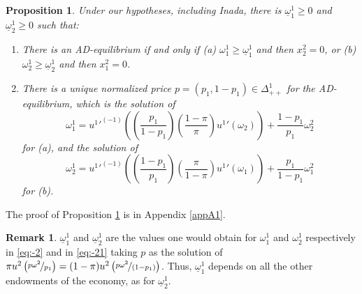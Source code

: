 \documentclass[pdftex]{article}
\numberwithin{equation}{section}
\theoremstyle{th}
\newtheorem{prop}{{Proposition}}%
\newtheorem{proof lemma}{{Proof Lemma}.}
\theoremstyle{definition}
\newtheorem{remark}{Remark}%
\newtheorem*{risk lovers}{Risk lovers}
\newtheorem*{risk averse}{Risk averse}
\begin{document}
\begin{prop}
\label{prop1}
Under our hypotheses, including Inada, there is $\underline{\omega}_1^1\geq0$ and $\underline{\omega}_2^1\geq0$ such that:
\begin{enumerate}
\item There is an AD-equilibrium if and only if (a) $\omega_1^1\geq\underline{\omega}_1^1$ and then $x_2^2=0$, or (b) $\omega_2^1\geq\underline{\omega}_2^1$ and then $x_1^2=0$. 

\item There is a unique normalized price $p=(p_1,1-p_1)\in\Delta_{++}^1$ for the AD-equilibrium, which is the solution of
\begin{equation}
\label{eq:-2}
\omega_1^1={{u^1}'}^{(-1)}\left(\left(\frac{p_1}{1-p_1}\right)\left(\frac{1-\pi}{\pi}\right){u^1}'\left(\omega_2\right)\right)+\frac{1-p_1}{p_1}\omega_2^2
\end{equation}
for (a), and the solution of
\begin{equation}
\label{eq:-21}
\omega_2^1={{u^1}'}^{(-1)}\left(\left(\frac{1-p_1}{p_1}\right)\left(\frac{\pi}{1-\pi}\right){u^1}'\left(\omega_1\right)\right)+\frac{p_1}{1-p_1}\omega_1^2
\end{equation}
for (b).
\end{enumerate}
\end{prop}
The proof of Proposition \ref{prop1} is in Appendix \ref{appA1}.


\begin{remark}
$\underline{\omega}_1^1$ and $\underline{\omega}_2^1$ are the values one would obtain for $\omega_1^1$ and $\omega_2^1$ respectively in \ref{eq:-2} and in \ref{eq:-21} taking $p$ as the solution of $\pi{u}^2\left(\nicefrac{p\omega^2}{p_1}\right)=(1-\pi)u^2\left(\nicefrac{p\omega^2}{(1-p_1)}\right)$.
Thus, $\underline{\omega}^1_1$ depends on all the other endowments of the economy, as for $\underline{\omega}^1_2$.
\end{remark}
\end{document}
